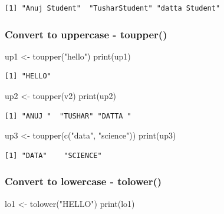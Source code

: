 \documentclass[
  letterpaper,
  DIV=11,
  numbers=noendperiod]{scrartcl}
\newenvironment{Shaded}{\begin{snugshade}}{\end{snugshade}}
\newcommand{\FunctionTok}[1]{\textcolor[rgb]{0.28,0.35,0.67}{#1}}
\newcommand{\NormalTok}[1]{\textcolor[rgb]{0.00,0.23,0.31}{#1}}
\newcommand{\OtherTok}[1]{\textcolor[rgb]{0.00,0.23,0.31}{#1}}
\newcommand{\StringTok}[1]{\textcolor[rgb]{0.13,0.47,0.30}{#1}}
\begin{document}
\begin{verbatim}
[1] "Anuj Student"  "TusharStudent" "datta Student"
\end{verbatim}

\subsubsection{Convert to uppercase -
toupper()}\label{convert-to-uppercase---toupper}

\begin{Shaded}
\begin{Highlighting}[]
\NormalTok{up1 }\OtherTok{\textless{}{-}} \FunctionTok{toupper}\NormalTok{(}\StringTok{"hello"}\NormalTok{)}
\FunctionTok{print}\NormalTok{(up1)}
\end{Highlighting}
\end{Shaded}

\begin{verbatim}
[1] "HELLO"
\end{verbatim}

\begin{Shaded}
\begin{Highlighting}[]
\NormalTok{up2 }\OtherTok{\textless{}{-}} \FunctionTok{toupper}\NormalTok{(v2)}
\FunctionTok{print}\NormalTok{(up2)}
\end{Highlighting}
\end{Shaded}

\begin{verbatim}
[1] "ANUJ "  "TUSHAR" "DATTA "
\end{verbatim}

\begin{Shaded}
\begin{Highlighting}[]
\NormalTok{up3 }\OtherTok{\textless{}{-}} \FunctionTok{toupper}\NormalTok{(}\FunctionTok{c}\NormalTok{(}\StringTok{"data"}\NormalTok{, }\StringTok{"science"}\NormalTok{))}
\FunctionTok{print}\NormalTok{(up3)}
\end{Highlighting}
\end{Shaded}

\begin{verbatim}
[1] "DATA"    "SCIENCE"
\end{verbatim}

\subsubsection{Convert to lowercase -
tolower()}\label{convert-to-lowercase---tolower}

\begin{Shaded}
\begin{Highlighting}[]
\NormalTok{lo1 }\OtherTok{\textless{}{-}} \FunctionTok{tolower}\NormalTok{(}\StringTok{"HELLO"}\NormalTok{)}
\FunctionTok{print}\NormalTok{(lo1)}
\end{Highlighting}
\end{Shaded}
\end{document}
